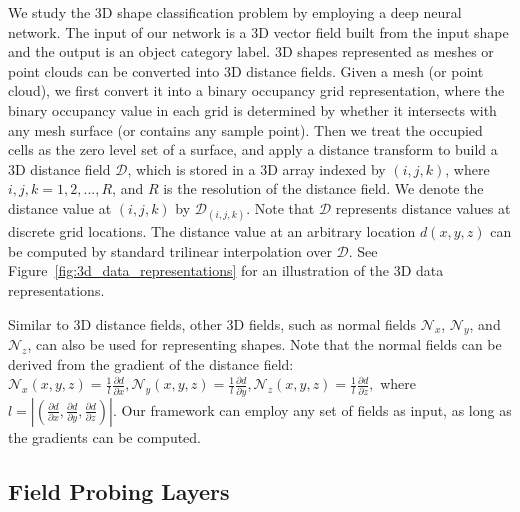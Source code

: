 We study the 3D shape classification problem by employing a deep neural network. The input of our network is a 3D vector field built from the input shape and the output is an object category label. 3D shapes represented as meshes or point clouds can be converted into 3D distance fields. Given a mesh (or point cloud), we first convert it into a binary occupancy grid representation, where the binary occupancy value in each grid is determined by whether it intersects with any mesh surface (or contains any sample point). Then we treat the occupied cells as the zero level set of a surface, and apply a distance transform to build a 3D distance field $\mathcal{D}$, which is stored in a 3D array indexed by $(i,j,k)$, where $i,j,k = 1,2,...,R$, and $R$ is the resolution of the distance field. We denote the distance value at $(i,j,k)$ by $\mathcal{D}_{(i,j,k)}$. Note that $\mathcal{D}$ represents distance values at discrete grid locations. The distance value at an arbitrary location $d(x,y,z)$ can be computed by standard trilinear interpolation over $\mathcal{D}$. See Figure~\ref{fig:3d_data_representations} for an illustration of the 3D data representations.

Similar to 3D distance fields, other 3D fields, such as normal fields $\mathcal{N}_x$, $\mathcal{N}_y$, and $\mathcal{N}_z$, can also be used for representing shapes.
Note that the normal fields can be derived from the gradient of the distance field:
$
{\mathcal{N}_x}(x,y,z) = \frac{1}{l}\frac{\partial d}{\partial x},
{\mathcal{N}_y}(x,y,z) = \frac{1}{l}\frac{\partial d}{\partial y},
{\mathcal{N}_z}(x,y,z) = \frac{1}{l}\frac{\partial d}{\partial z},
$
where $l=|(\frac{\partial d}{\partial x}, \frac{\partial d}{\partial y}, \frac{\partial d}{\partial z})|$.
Our framework can employ any set of fields as input, as long as the gradients can be computed.

\subsection{Field Probing Layers}
\label{sec:fpnn_layers}

